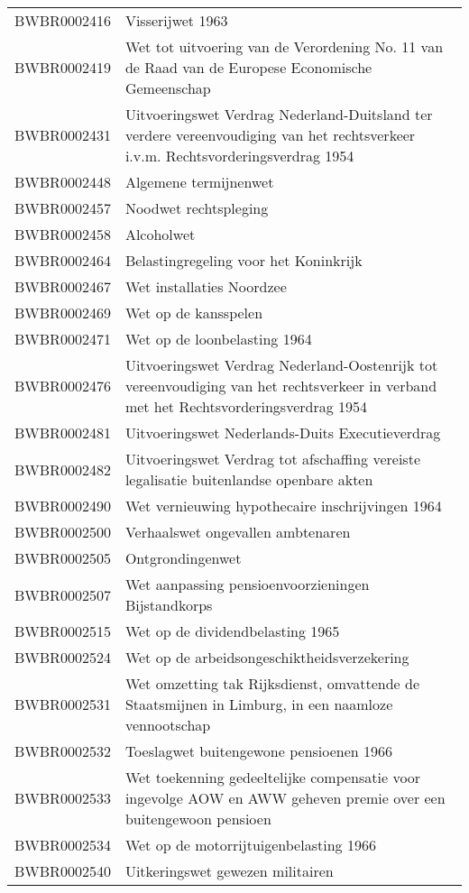 \begin{longtable}{lp{}}
BWBR0002416 & Visserijwet 1963 \\
BWBR0002419 & Wet tot uitvoering van de Verordening No. 11 van de Raad van de Europese Economische Gemeenschap \\
BWBR0002431 & Uitvoeringswet Verdrag Nederland-Duitsland ter verdere vereenvoudiging van het rechtsverkeer i.v.m. Rechtsvorderingsverdrag 1954 \\
BWBR0002448 & Algemene termijnenwet \\
BWBR0002457 & Noodwet rechtspleging  \\
BWBR0002458 & Alcoholwet \\
BWBR0002464 & Belastingregeling voor het Koninkrijk \\
BWBR0002467 & Wet installaties Noordzee \\
BWBR0002469 & Wet op de kansspelen \\
BWBR0002471 & Wet op de loonbelasting 1964 \\
BWBR0002476 & Uitvoeringswet Verdrag Nederland-Oostenrijk tot vereenvoudiging van het rechtsverkeer in verband met het Rechtsvorderingsverdrag 1954 \\
BWBR0002481 & Uitvoeringswet Nederlands-Duits Executieverdrag \\
BWBR0002482 & Uitvoeringswet Verdrag tot afschaffing vereiste legalisatie buitenlandse openbare akten \\
BWBR0002490 & Wet vernieuwing hypothecaire inschrijvingen 1964 \\
BWBR0002500 & Verhaalswet ongevallen ambtenaren \\
BWBR0002505 &  Ontgrondingenwet  \\
BWBR0002507 & Wet aanpassing pensioenvoorzieningen Bijstandkorps \\
BWBR0002515 & Wet op de dividendbelasting 1965 \\
BWBR0002524 & Wet op de arbeidsongeschiktheidsverzekering \\
BWBR0002531 & Wet omzetting tak Rijksdienst, omvattende de Staatsmijnen in Limburg, in een naamloze vennootschap \\
BWBR0002532 & Toeslagwet buitengewone pensioenen 1966 \\
BWBR0002533 & Wet toekenning gedeeltelijke compensatie voor ingevolge AOW en AWW geheven premie over een buitengewoon pensioen \\
BWBR0002534 & Wet op de motorrijtuigenbelasting 1966 \\
BWBR0002540 & Uitkeringswet gewezen militairen \\

\end{longtable}
